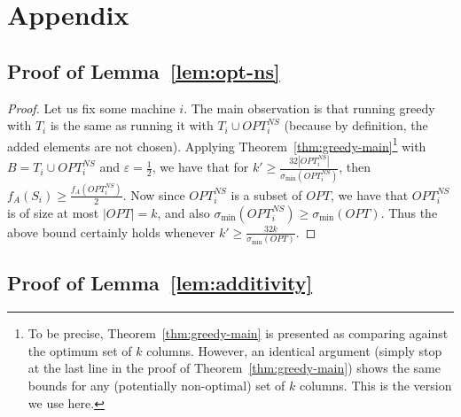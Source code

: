 \documentclass{article}
\newcommand{\eps}{\varepsilon}
\newcommand{\opt}{OPT}
\begin{document}



\clearpage
\appendix


\section{Appendix}

\subsection{Proof of Lemma~\ref{lem:opt-ns}}\label{app:opt-ns}
\begin{proof}
Let us fix some machine $i$. The main observation is that running greedy with $T_i$ is the same as running it with $T_i \cup \opt_i^{NS}$ (because by definition, the added elements are not chosen).  Applying Theorem~\ref{thm:greedy-main}\footnote{To be precise, Theorem~\ref{thm:greedy-main} is presented as comparing against the optimum set of $k$ columns. However, an identical argument (simply stop at the last line in the proof of Theorem~\ref{thm:greedy-main}) shows the same bounds for any (potentially non-optimal) set of $k$ columns. This is the version we use here.} with $B = T_i \cup \opt_i^{NS}$ and $\eps = \frac{1}{2}$, we have that for
$ k' \ge \frac{32 |\opt_i^{NS}|}{\sigma_{\min}(\opt_i^{NS})}$,
then $f_A(S_i) \geq \frac{f_A(\opt_i^{NS})}{2}$. Now since $\opt_i^{NS}$ is a subset of $\opt$, we have that $\opt_i^{NS}$ is of size at most $|\opt| = k$, and also $\sigma_{\min}(\opt_i^{NS}) \ge \sigma_{\min}(\opt)$. Thus the above bound certainly holds whenever $k' \ge \frac{32 k}{\sigma_{\min}(\opt)}$.
\end{proof}

\subsection{Proof of Lemma~\ref{lem:additivity}} \label{app:additivity}
\end{document}
